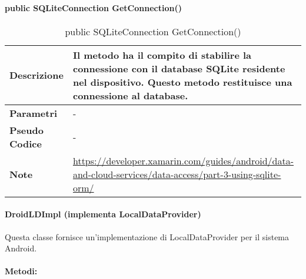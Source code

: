 \paragraph{public SQLiteConnection GetConnection()}
    \begin{center}
        \begin{longtable}{|p{3cm}|p{9cm}|}%
        \caption{public SQLiteConnection GetConnection()}
        \endfirsthead
        \endhead
        \hline
        \textbf{Descrizione} & Il metodo ha il compito di stabilire la connessione con il database SQLite residente nel dispositivo. Questo metodo restituisce una connessione al database.\\
        \hline
        \textbf{Parametri} &      
        -
        \\
        \hline
        \textbf{Pseudo Codice} & 
        -
        \\
        \hline
        \textbf{Note} & 
        \url{https://developer.xamarin.com/guides/android/data-and-cloud-services/data-access/part-3-using-sqlite-orm/}
        \\
        \hline
        \end{longtable}
        \end{center}

\paragraph{DroidLDImpl (implementa LocalDataProvider)}
Questa classe fornisce un’implementazione di LocalDataProvider per il sistema Android.
\paragraph{Metodi:}
